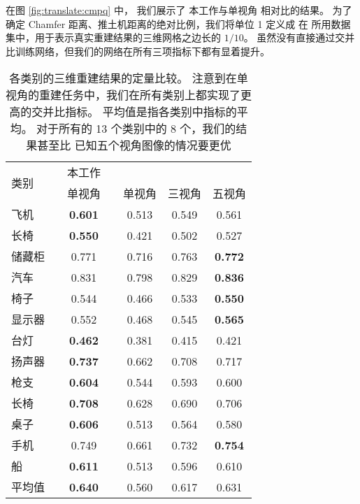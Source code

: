 在图 \ref{fig:translate:cmpq} 中，
我们展示了%
本工作与单视角 \threedrsns 相对比的结果。
为了确定 Chamfer 距离、推土机距离的绝对比例，我们将单位 1 定义成
在 \threedrsns 所用数据集中，用于表示真实重建结果的三维网格之边长的 $1/10$。 虽然没有直接通过交并比训练网络，但我们的网络在所有三项指标下都有显着提升。

\begin{table}[h]
	\centering
	\caption[]{各类别的三维重建结果的定量比较。 注意到在单视角的重建任务中，我们在所有类别上都实现了更高的交并比指标。 平均值是指各类别中指标的平均。 对于所有的 13 个类别中的 8 个，我们的结果甚至比 \threedrsns 已知五个视角图像的情况要更优}
	\label{tab:translate:cmp}
	\begin{tabular}{lcccccc}
		\toprule[1.5pt]
		\multirow{2}{*}{类别} &  & 本工作         &  &
		\multicolumn{3}{c}{\threedrsns}
		\\
		\cline{3-3} \cline{5-7}
		                      &  & 单视角         &  & 单视角 & 三视角 & 五视角
		\\
		\midrule[1pt]
		飞机                  &  & \textbf{0.601} &  & 0.513  & 0.549  & 0.561          \\
		长椅                  &  & \textbf{0.550} &  & 0.421  & 0.502  & 0.527          \\
		储藏柜                &  & 0.771          &  & 0.716  & 0.763  & \textbf{0.772} \\
		汽车                  &  & 0.831          &  & 0.798  & 0.829  & \textbf{0.836} \\
		椅子                  &  & 0.544          &  & 0.466  & 0.533  & \textbf{0.550} \\
		显示器                &  & 0.552          &  & 0.468  & 0.545  & \textbf{0.565} \\
		台灯                  &  & \textbf{0.462} &  & 0.381  & 0.415  & 0.421          \\
		扬声器                &  & \textbf{0.737} &  & 0.662  & 0.708  & 0.717          \\
		枪支                  &  & \textbf{0.604} &  & 0.544  & 0.593  & 0.600          \\
		长椅                  &  & \textbf{0.708} &  & 0.628  & 0.690  & 0.706          \\
		桌子                  &  & \textbf{0.606} &  & 0.513  & 0.564  & 0.580          \\
		手机                  &  & 0.749          &  & 0.661  & 0.732  & \textbf{0.754} \\
		船                    &  & \textbf{0.611} &  & 0.513  & 0.596  & 0.610          \\
		\hline
		平均值                &  & \textbf{0.640} &  & 0.560  & 0.617  & 0.631          \\
		\bottomrule[1.5pt]
	\end{tabular}
\end{table}


